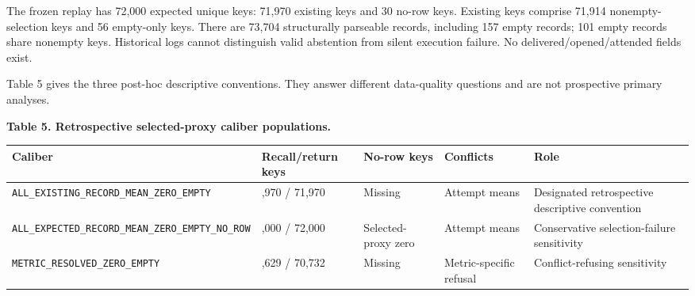 \documentclass[
  11pt]{article}
\begin{document}
The frozen replay has 72,000 expected unique keys: 71,970 existing keys
and 30 no-row keys. Existing keys comprise 71,914 nonempty-selection
keys and 56 empty-only keys. There are 73,704 structurally parseable
records, including 157 empty records; 101 empty records share nonempty
keys. Historical logs cannot distinguish valid abstention from silent
execution failure. No delivered/opened/attended fields exist.

Table 5 gives the three post-hoc descriptive conventions. They answer
different data-quality questions and are not prospective primary
analyses.

\textbf{Table 5. Retrospective selected-proxy caliber populations.}

\begin{longtable}[]{@{}
  >{\raggedright\arraybackslash}p{}
  >{\raggedleft\arraybackslash}p{}
  >{\raggedright\arraybackslash}p{}
  >{\raggedright\arraybackslash}p{}
  >{\raggedright\arraybackslash}p{}@{}}
\toprule\noalign{}
\begin{minipage}[b]{\linewidth}\raggedright
Caliber
\end{minipage} & \begin{minipage}[b]{\linewidth}\raggedleft
Recall/return keys
\end{minipage} & \begin{minipage}[b]{\linewidth}\raggedright
No-row keys
\end{minipage} & \begin{minipage}[b]{\linewidth}\raggedright
Conflicts
\end{minipage} & \begin{minipage}[b]{\linewidth}\raggedright
Role
\end{minipage} \\
\midrule\noalign{}
\endhead
\bottomrule\noalign{}
\endlastfoot
\texttt{ALL\_EXISTING\_}\allowbreak \texttt{RECORD\_MEAN\_}\allowbreak \texttt{ZERO\_EMPTY}
& 71,970 / 71,970 & Missing & Attempt means & Designated retrospective
descriptive convention \\
\texttt{ALL\_EXPECTED\_}\allowbreak \texttt{RECORD\_MEAN\_}\allowbreak \texttt{ZERO\_EMPTY\_}\allowbreak \texttt{NO\_ROW}
& 72,000 / 72,000 & Selected-proxy zero & Attempt means & Conservative
selection-failure sensitivity \\
\texttt{METRIC\_RESOLVED\_}\allowbreak \texttt{ZERO\_EMPTY} & 71,629 /
70,732 & Missing & Metric-specific refusal & Conflict-refusing
sensitivity \\
\end{longtable}
\end{document}
